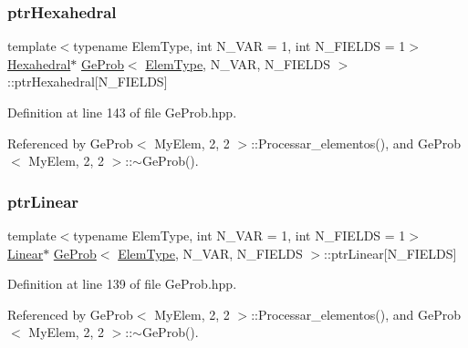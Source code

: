 \subsubsection{\texorpdfstring{ptr\+Hexahedral}{ptrHexahedral}}
{\footnotesize\ttfamily template$<$typename Elem\+Type, int N\+\_\+\+V\+AR = 1, int N\+\_\+\+F\+I\+E\+L\+DS = 1$>$ \\
\hyperlink{classHexahedral}{Hexahedral}$\ast$ \hyperlink{classGeProb}{Ge\+Prob}$<$ \hyperlink{spectral_8h_aaa2c1a7b2d1b12c590d730fe6ac839fa}{Elem\+Type}, N\+\_\+\+V\+AR, N\+\_\+\+F\+I\+E\+L\+DS $>$\+::ptr\+Hexahedral\mbox{[}N\+\_\+\+F\+I\+E\+L\+DS\mbox{]}\hspace{0.3cm}{\ttfamily [protected]}}



Definition at line 143 of file Ge\+Prob.\+hpp.



Referenced by Ge\+Prob$<$ My\+Elem, 2, 2 $>$\+::\+Processar\+\_\+elementos(), and Ge\+Prob$<$ My\+Elem, 2, 2 $>$\+::$\sim$\+Ge\+Prob().

\mbox{\label{classGeProb_af9350545b7ee2ebe6488a50dd1f38c8c}} 
\subsubsection{\texorpdfstring{ptr\+Linear}{ptrLinear}}
{\footnotesize\ttfamily template$<$typename Elem\+Type, int N\+\_\+\+V\+AR = 1, int N\+\_\+\+F\+I\+E\+L\+DS = 1$>$ \\
\hyperlink{classLinear}{Linear}$\ast$ \hyperlink{classGeProb}{Ge\+Prob}$<$ \hyperlink{spectral_8h_aaa2c1a7b2d1b12c590d730fe6ac839fa}{Elem\+Type}, N\+\_\+\+V\+AR, N\+\_\+\+F\+I\+E\+L\+DS $>$\+::ptr\+Linear\mbox{[}N\+\_\+\+F\+I\+E\+L\+DS\mbox{]}\hspace{0.3cm}{\ttfamily [protected]}}



Definition at line 139 of file Ge\+Prob.\+hpp.



Referenced by Ge\+Prob$<$ My\+Elem, 2, 2 $>$\+::\+Processar\+\_\+elementos(), and Ge\+Prob$<$ My\+Elem, 2, 2 $>$\+::$\sim$\+Ge\+Prob().

\mbox{\label{classGeProb_ada73c5b700f7681fde499a3a27ff377e}} 
